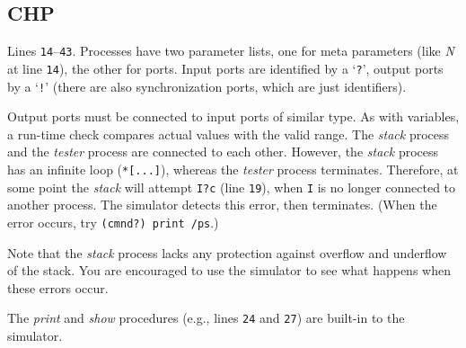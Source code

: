 
\subsection{CHP}\label{sec:demochp}

Lines {\tt{}14}--{\tt{}43}. Processes have two parameter lists, one for
meta parameters (like {\it{}N} at line {\tt{}14}), the other for ports. Input
ports are identified by a `{\tt{}?}', output ports by a `{\tt{}!}' (there are
also synchronization ports, which are just identifiers).

Output ports must be connected to input ports of similar type. As with
variables, a run-time check compares actual values with the valid range.
The {\it{}stack} process and the {\it{}tester} process are connected to each other.
However, the {\it{}stack} process has an infinite loop ({\tt{}*[...]}), whereas
the {\it{}tester} process terminates. Therefore, at some point the {\it{}stack}
will attempt {\tt{}I?c} (line {\tt{}19}), when {\tt{}I} is no longer connected to
another process. The simulator detects this error, then terminates.
(When the error occurs, try {\tt{}(cmnd?) print /ps}.)

Note that the {\it{}stack} process lacks any protection against overflow
and underflow of the stack. You are encouraged to use the simulator
to see what happens when these errors occur.

The {\it{}print} and {\it{}show} procedures (e.g., lines {\tt{}24} and {\tt{}27}) are
built-in to the simulator.










